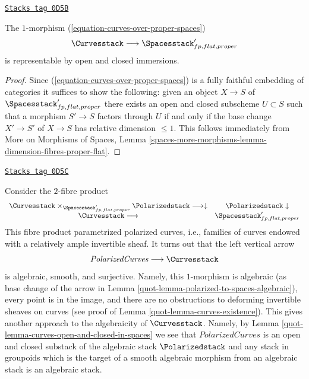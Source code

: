 \begin{lemma}
\label{quot-lemma-curves-open-and-closed-in-spaces}
\href{https://stacks.math.columbia.edu/tag/0D5B}{\texttt{Stacks tag 0D5B}}

The $1$-morphism (\ref{equation-curves-over-proper-spaces})
$$
\Curvesstack \longrightarrow \Spacesstack'_{fp, flat, proper}
$$
is representable by open and closed immersions.
\end{lemma}

\begin{proof}
Since (\ref{equation-curves-over-proper-spaces}) is a fully faithful
embedding of categories it suffices to show the following:
given an object $X \to S$ of $\Spacesstack'_{fp, flat, proper}$
there exists an open and closed subscheme $U \subset S$
such that a morphism $S' \to S$ factors through $U$ if and only if the
base change $X' \to S'$ of $X \to S$ has relative dimension $\leq 1$.
This follows immediately from
More on Morphisms of Spaces, Lemma
\ref{spaces-more-morphisms-lemma-dimension-fibres-proper-flat}.
\end{proof}

\begin{remark}
\label{quot-remark-alternative-approach-curves}
\href{https://stacks.math.columbia.edu/tag/0D5C}{\texttt{Stacks tag 0D5C}}

Consider the $2$-fibre product
$$
\begin{array}{cc}\Curvesstack \times_{\Spacesstack'_{fp, flat, proper}}
\Polarizedstack \longrightarrow\downarrow & \Polarizedstack \downarrow \\ \Curvesstack \longrightarrow & \Spacesstack'_{fp, flat, proper}\end{array}
$$
This fibre product parametrized polarized curves, i.e., families
of curves endowed with a relatively ample invertible sheaf.
It turns out that the left vertical arrow
$$
\textit{PolarizedCurves} \longrightarrow \Curvesstack
$$
is algebraic, smooth, and surjective. Namely, this $1$-morphism
is algebraic (as base change of the arrow in
Lemma \ref{quot-lemma-polarized-to-spaces-algebraic}),
every point is in the image, and
there are no obstructions to deforming invertible sheaves on curves
(see proof of Lemma \ref{quot-lemma-curves-existence}).
This gives another approach to the algebraicity of $\Curvesstack$.
Namely, by Lemma \ref{quot-lemma-curves-open-and-closed-in-spaces}
we see that $\textit{PolarizedCurves}$ is an open and closed substack
of the algebraic stack $\Polarizedstack$ and any stack in groupoids
which is the target of a smooth algebraic morphism from an algebraic
stack is an algebraic stack.
\end{remark}

